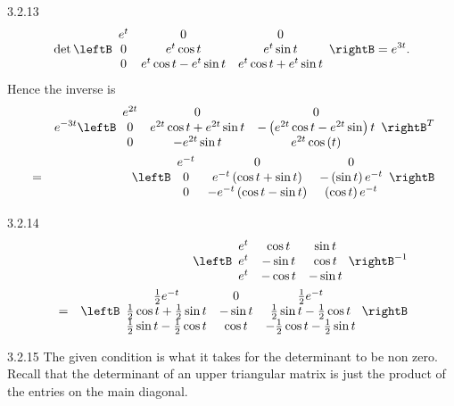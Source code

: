 \begin{Answer}{3.2.13}
\[
\det \leftB
\begin{array}{ccc}
e^{t} & 0 & 0 \\
0 & e^{t}\cos t & e^{t}\sin t \\
0 & e^{t}\cos t-e^{t}\sin t & e^{t}\cos t+e^{t}\sin t
\end{array}
\rightB = e^{3t}.
\]
Hence the inverse is
\begin{eqnarray*}
&&e^{-3t}\leftB
\begin{array}{ccc}
e^{2t} & 0 & 0 \\
0 & e^{2t}\cos t+e^{2t}\sin t & -\left( e^{2t}\cos t-e^{2t}\sin \right) t \\
0 & -e^{2t}\sin t & e^{2t}\cos \left( t\right)
\end{array}
\rightB ^{T} \\
&=& \leftB
\begin{array}{ccc}
e^{-t} & 0 & 0 \\
0 & e^{-t}\left( \cos t+\sin t\right)  & -\left( \sin t\right) e^{-t} \\
0 & -e^{-t}\left( \cos t-\sin t\right)  & \left( \cos t\right) e^{-t}
\end{array}
\rightB
\end{eqnarray*}
\end{Answer}
\begin{Answer}{3.2.14}
\begin{eqnarray*}
&&\leftB
\begin{array}{ccc}
e^{t} & \cos t & \sin t \\
e^{t} & -\sin t & \cos t \\
e^{t} & -\cos t & -\sin t
\end{array}
\rightB ^{-1} \\
&=&\leftB
\begin{array}{ccc}
\frac{1}{2}e^{-t} & 0 & \frac{1}{2}e^{-t} \\
\frac{1}{2}\cos t+\frac{1}{2}\sin t & -\sin t & \frac{1}{2}\sin t-\frac{1}{2}
\cos t \\
\frac{1}{2}\sin t-\frac{1}{2}\cos t & \cos t & -\frac{1}{2}\cos t-\frac{1}{2}
\sin t
\end{array}
\rightB
\end{eqnarray*}
\end{Answer}
\begin{Answer}{3.2.15}
The given condition is what it takes for the
determinant to be non zero. Recall that the determinant of an upper
triangular matrix is just the product of the entries on the main diagonal.
\end{Answer}
